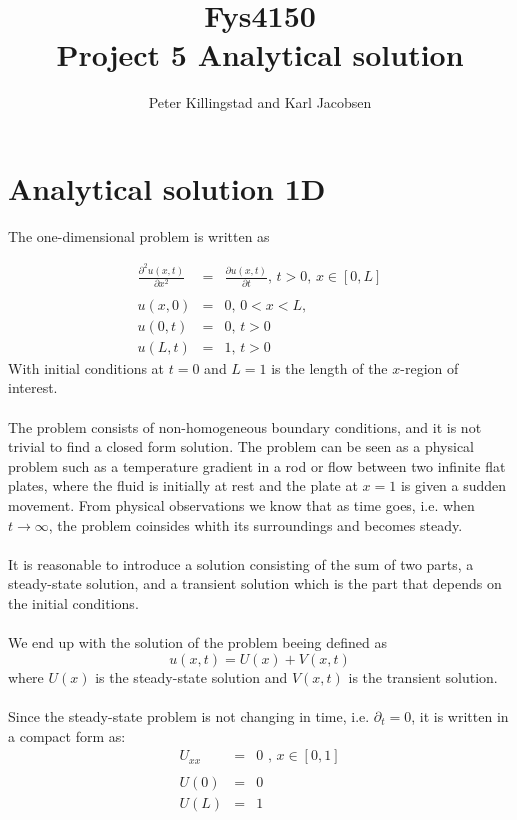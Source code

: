 \documentclass{article}
\title{Fys4150\\Project 5 Analytical solution\\ }
\author{Peter Killingstad and Karl Jacobsen}
\begin{document}
\maketitle
\section*{Analytical solution 1D}
The one-dimensional problem is written as 

\begin{subequations}
\begin{eqnarray}
	\frac{\partial^2 u(x,t)}{\partial x^2} &=& \frac{\partial u(x,t)}{\partial t} \textit{, } t> 0 \textit{, } x \in [0,L] \\ \nonumber
\\
u(x,0) &=& 0 \textit{, } 0 <x < L \textit{,} \\
u(0,t) &=& 0 \textit{, } t>0 \\
u(L,t) &=& 1 \textit{, } t>0
\end{eqnarray}
\end{subequations}
With initial conditions at $t=0$ and $L=1$ is the length of the $x$-region of interest.
\\
\\
The problem consists of non-homogeneous boundary conditions, and it is not trivial to find a closed form solution. The problem can be seen as a physical problem such as a temperature gradient in a rod or flow between two infinite flat plates, where the fluid is initially at rest and the plate at $x=1$ is given a sudden movement. From physical observations we know that as time goes, i.e. when $t\rightarrow \infty$,  the problem coinsides whith its surroundings and becomes steady.\\
\\ It is reasonable to introduce a solution consisting of the sum of two parts, a steady-state solution, and a transient solution which is the part that depends on the initial conditions.\\ \\
We end up with the solution of the problem beeing defined as
\begin{equation}
u(x,t) = U(x) + V(x,t)
\end{equation}
where $U(x)$ is the steady-state solution and $V(x,t)$ is the transient solution.\\ 
\\
Since the steady-state problem is not changing in time, i.e. $\partial_ t = 0$, it is written in a compact form as:
\begin{subequations}
\begin{eqnarray}
\label{eqn:steadyStateSODE}
U_{xx} &=& 0 \textit{ , } x \in [0,1]\\ \nonumber
\\
U(0) &=& 0 \textit{  } \\
U(L) &=& 1
\end{eqnarray}
\end{subequations}
\end{document}
